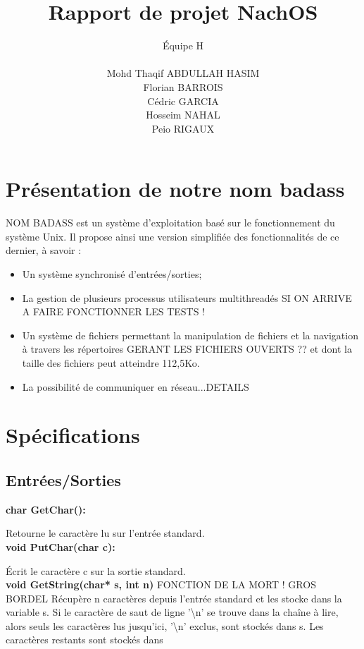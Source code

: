 \documentclass[12pt]{report}
\title{Rapport de projet NachOS}
\author{
\'Equipe H\\\\
Mohd Thaqif ABDULLAH HASIM\\
Florian BARROIS\\
Cédric GARCIA\\
Hosseim NAHAL\\
Peio RIGAUX\\
}
\begin{document}
\maketitle


\chapter{Présentation de \color{red}notre nom badass\color{black}}

\color{red}NOM BADASS\color{black} est un système d'exploitation basé sur le fonctionnement du système Unix. Il propose ainsi une version simplifiée des fonctionnalités de ce dernier, à savoir :
\begin{itemize}\renewcommand{\labelitemi}{$\bullet$}
\item Un système synchronisé d'entrées/sorties;
\item La gestion de plusieurs processus utilisateurs multithreadés \color{red}SI ON ARRIVE A FAIRE FONCTIONNER LES TESTS !\color{black}
\item Un système de fichiers permettant la manipulation de fichiers et la navigation à travers les répertoires \color{red}GERANT LES FICHIERS OUVERTS ??\color{black} et dont la taille des fichiers peut atteindre 112,5Ko.
\item La possibilité de communiquer en réseau...\color{red}DETAILS\color{black}

\end{itemize}


\chapter{Spécifications}
\section{Entrées/Sorties}

\textbf{char GetChar():}

Retourne le caractère lu sur l'entrée standard.\\


\textbf{void PutChar(char c):}

Écrit le caractère c sur la sortie standard.\\


\textbf{void GetString(char* s, int n)}
\color{red} FONCTION DE LA MORT ! GROS BORDEL
Récupère n caractères depuis l'entrée standard et les stocke dans la  variable s. Si le caractère de saut de ligne '\textbackslash n' se trouve dans la chaîne à lire, alors seuls les caractères lus jusqu'ici, '\textbackslash n' exclus, sont stockés dans s. Les caractères restants sont stockés dans \color{black}
\end{document}
